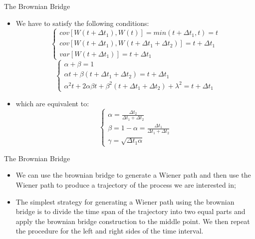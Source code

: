 \documentclass[11pt]{beamer}
\begin{document}
\begin{frame}{The Brownian Bridge}
\begin{itemize}
\item We have to satisfy the following conditions:
\footnotesize
$$
\begin{cases} 
cov[W(t+\Delta t_1), W(t)] = min(t+\Delta t_1,t)=t \\ 
cov[W(t+\Delta t_1), W(t+\Delta t_1 + \Delta t_2)] = t + \Delta t_1 \\ 
var[W(t+\Delta t_1)] = t + \Delta t_1 
\end{cases}
$$
$$
\begin{cases} 
\alpha + \beta = 1 \\ 
\alpha t + \beta (t + \Delta t_1 + \Delta t_2) = t + \Delta t_1 \\ 
\alpha^2  t + 2 \alpha \beta t + \beta^2 (t + \Delta t_1 + \Delta t_2) + \lambda^2 = t +\Delta t_1 
\end{cases}
$$
\normalsize
\item which are equivalent to:
\footnotesize
$$
\begin{cases} 
\alpha = \frac{\Delta t_2}{\Delta t_1 + \Delta t_2} \\ 
\beta = 1 - \alpha  = \frac{\Delta t_1}{\Delta t_1 + \Delta t_2}\\ 
\gamma = \sqrt{\Delta t_1 \alpha}
\end{cases}
$$
\normalsize
\end{itemize}
\end{frame}
\begin{frame}{The Brownian Bridge}
\begin{itemize}
\item We can use the brownian bridge to generate a Wiener path and then use the Wiener path to produce a trajectory of the process we are interested in;
\item The simplest strategy for generating a Wiener path using the brownian bridge is to divide the time span of the trajectory into two equal parts and apply the brownian bridge construction to the middle point. We then repeat the procedure for the left and right sides of the time interval.
\end{itemize}
\end{frame}
\end{document}
